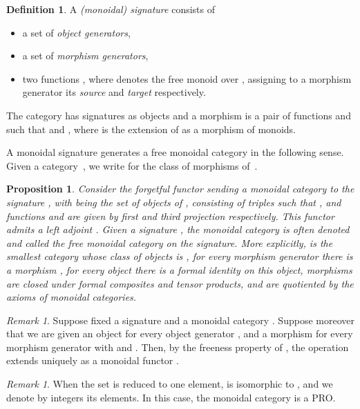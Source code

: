 \documentclass[submission,copyright,creativecommons]{eptcs}
\newtheorem{proposition}[theorem]{Proposition}
\theoremstyle{definition}
\newtheorem{definition}[theorem]{Definition}
\theoremstyle{remark}
\newtheorem{remark}[theorem]{Remark}
\begin{document}
\begin{definition}
  A \emph{(monoidal) signature}  consists of
  \begin{itemize}
  \item a set  of \emph{object generators},
  \item a set  of \emph{morphism generators},
  \item two functions , where 
    denotes the free monoid over , assigning to a morphism generator
    its \emph{source} and \emph{target} respectively.
  \end{itemize}
  The category  has signatures as objects and a morphism
   is a pair
   of functions  and
   such that  and
  , where  is
  the extension of  as a morphism of monoids.
\end{definition}

A monoidal signature generates a free monoidal category in the following
sense. Given a category~, we write  for the class of morphisms
of~.

\begin{proposition}
  Consider the forgetful functor  sending a monoidal
  category  to the signature
  , with  being the set of objects
  of ,  consisting of triples  such that
  , and
  functions  and  are given by first and third projection
  respectively. This functor admits a left adjoint . Given
  a signature , the monoidal category  is often denoted
   and called the \emph{free monoidal category} on the signature.
More explicitly,  is the smallest category whose class of objects is
  , for every morphism generator  there is a morphism
  , for every object there is a formal identity on
  this object, morphisms are closed under formal composites and tensor products,
  and are quotiented by the axioms of monoidal categories.
\end{proposition}

\begin{remark}
  \label{rem:free-moncat}
  Suppose fixed a signature  and a monoidal
  category . Suppose moreover that we are given an object 
  for every object generator , and a morphism
   for
  every morphism generator  with 
  and . Then, by the freeness property of ,
  the operation  extends uniquely as a monoidal functor .
\end{remark}



\begin{remark}
  \label{rem:1-object}
  When the set  is reduced to one element,  is
  isomorphic to , and we denote by integers its elements. In this case, the
  monoidal category  is a PRO.
\end{remark}
\end{document}
